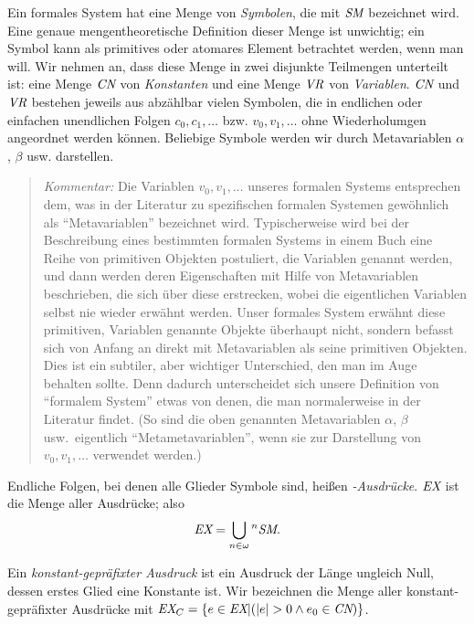 Ein formales System hat eine Menge von {\em Symbolen}, die mit $\mbox{\em SM}$ bezeichnet wird.  Eine genaue mengentheoretische Definition dieser Menge ist unwichtig; ein Symbol kann als primitives oder atomares Element betrachtet werden, wenn man will.  Wir nehmen an, dass diese Menge in zwei disjunkte Teilmengen unterteilt ist: eine Menge $\mbox{\em CN}$ von {\em Konstanten} und eine Menge $\mbox{\em VR}$ von {\em Variablen}. $\mbox{\em CN}$ und $\mbox{\em VR}$ bestehen jeweils aus abzählbar vielen Symbolen, die in endlichen oder einfachen unendlichen Folgen $c_0, c_1, \ldots$ bzw. $v_0, v_1, \ldots$ ohne Wiederholumgen angeordnet werden können.  Beliebige Symbole werden wir durch Metavariablen $\alpha$, $\beta$ usw. darstellen. 

{\footnotesize\begin{quotation}
{\em Kommentar:} Die Variablen $v_0, v_1, \ldots$ unseres formalen Systems ent\-spre\-chen dem, was in der Literatur zu spezifischen formalen Systemen gewöhnlich als "`Metavariablen"' bezeichnet wird.  Typischerweise wird bei der Beschreibung eines bestimmten formalen Systems in einem Buch eine Reihe von primitiven Objekten postuliert, die Variablen genannt werden, und dann werden deren Eigenschaften mit Hilfe von Metavariablen beschrieben, die sich über diese erstrecken, wobei die eigentlichen Variablen selbst nie wieder erwähnt werden.  Unser formales System erwähnt diese primitiven, Variablen genannte Objekte überhaupt nicht, sondern befasst sich von Anfang an direkt mit Metavariablen als seine primitiven Objekten.  Dies ist ein subtiler, aber wichtiger Unterschied, den man im Auge behalten sollte. Denn dadurch unterscheidet sich unsere Definition von "`formalem System"' etwas von denen, die man normalerweise in der Literatur findet.  (So sind die oben genannten Metavariablen $\alpha$, $\beta$ usw.\ eigentlich "`Metametavariablen"', wenn sie zur Darstellung von $v_0, v_1, \ldots$ verwendet werden.)
\end{quotation}}

Endliche Folgen, bei denen alle Glieder Symbole sind, heißen {\em-Ausdrücke}. $\mbox{\em EX}$ ist die Menge aller Ausdrücke; also 
\begin{displaymath}
\mbox{\em EX} = \bigcup _{n \in \omega} {}^n \mbox{\em SM}.
\end{displaymath}

Ein {\em konstant-gepräfixter Ausdruck} ist ein Ausdruck der Länge ungleich Null, dessen erstes Glied eine Konstante ist.  Wir bezeichnen die Menge aller konstant-gepräfixter Ausdrücke mit $\mbox{\em EX}_C = \{ e \in \mbox{\em EX} | ( |e| > 0 \wedge e_0 \in \mbox{\em CN} ) \}$. 

